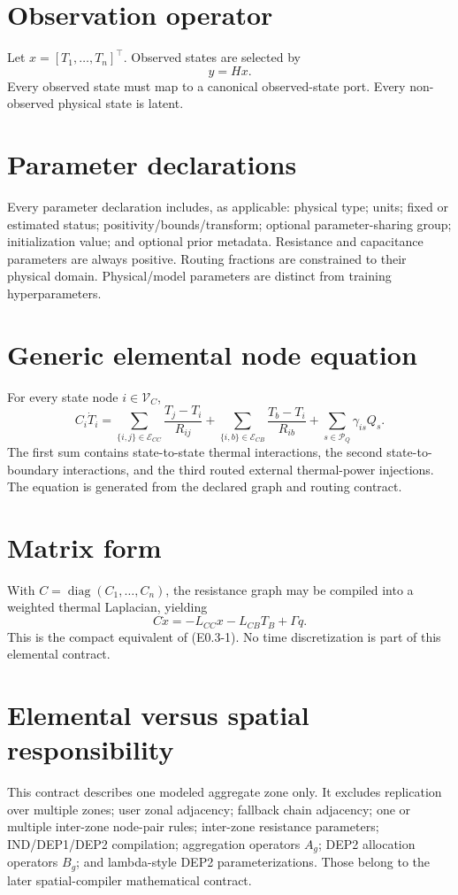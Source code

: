 \documentclass[11pt]{article}
\newcommand{\Vc}{\mathcal{V}_{C}}
\newcommand{\Ecc}{\mathcal{E}_{CC}}
\newcommand{\Ecb}{\mathcal{E}_{CB}}
\newcommand{\PQ}{\mathcal{P}_{Q}}
\begin{document}
\section{Observation operator}
Let $x=[T_1,\ldots,T_n]^\top$. Observed states are selected by
\[
\boxed{y=Hx.}
\]
Every observed state must map to a canonical observed-state port. Every non-observed physical state is latent.

\section{Parameter declarations}
Every parameter declaration includes, as applicable: physical type; units; fixed or estimated status; positivity/bounds/transform; optional parameter-sharing group; initialization value; and optional prior metadata. Resistance and capacitance parameters are always positive. Routing fractions are constrained to their physical domain. Physical/model parameters are distinct from training hyperparameters.

\section{Generic elemental node equation}
For every state node $i\in\Vc$,
\[
\boxed{
C_i\dot T_i
=
\sum_{\{i,j\}\in\Ecc}\frac{T_j-T_i}{R_{ij}}
+
\sum_{\{i,b\}\in\Ecb}\frac{T_b-T_i}{R_{ib}}
+
\sum_{s\in\PQ}\gamma_{is}Q_s.
}
\tag{E0.3-1}
\]
The first sum contains state-to-state thermal interactions, the second state-to-boundary interactions, and the third routed external thermal-power injections. The equation is generated from the declared graph and routing contract.

\section{Matrix form}
With $C=\operatorname{diag}(C_1,\ldots,C_n)$, the resistance graph may be compiled into a weighted thermal Laplacian, yielding
\[
\boxed{C\dot x=-L_{CC}x-L_{CB}T_B+\Gamma q.}
\tag{E0.3-2}
\]
This is the compact equivalent of (E0.3-1). No time discretization is part of this elemental contract.

\section{Elemental versus spatial responsibility}
This contract describes one modeled aggregate zone only. It excludes replication over multiple zones; user zonal adjacency; fallback chain adjacency; one or multiple inter-zone node-pair rules; inter-zone resistance parameters; IND/DEP1/DEP2 compilation; aggregation operators $A_g$; DEP2 allocation operators $B_g$; and lambda-style DEP2 parameterizations. Those belong to the later spatial-compiler mathematical contract.
\end{document}
